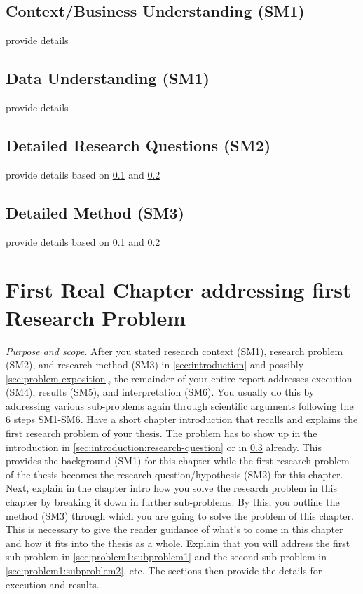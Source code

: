 \documentclass[peerreview,a4paper,english]{IEEEtran}[2015/08/26]
\begin{document}
\subsection{Context/Business Understanding (SM1)}\label{sec:problem-exposition:context-understanding}
provide details
\subsection{Data Understanding (SM1)}\label{sec:problem-exposition:data-understanding}
provide details
\subsection{Detailed Research Questions (SM2)}\label{sec:problem-exposition:research-problems}
provide details based on \cref{sec:problem-exposition:context-understanding} and \ref{sec:problem-exposition:data-understanding}
\subsection{Detailed Method (SM3)}\label{sec:problem-exposition:research-method}
provide details based on \cref{sec:problem-exposition:context-understanding} and \ref{sec:problem-exposition:data-understanding}
\section{First Real Chapter addressing first Research Problem}\label{sec:problem1}
\emph{Purpose and scope}. After you stated research context (SM1), research problem (SM2), and research method (SM3) in \cref{sec:introduction} and possibly \cref{sec:problem-exposition}, the remainder of your entire report addresses execution (SM4), results (SM5), and interpretation (SM6). You usually do this by addressing various sub-problems again through scientific arguments following the 6 steps SM1-SM6.
Have a short chapter introduction that recalls and explains the first research problem of your thesis. The problem has to show up in the introduction in \cref{sec:introduction:research-question} or in \cref{sec:problem-exposition:research-problems} already. This provides the background (SM1) for this chapter while the first research problem of the thesis becomes the research question/hypothesis (SM2) for this chapter.
Next, explain in the chapter intro how you solve the research problem in this chapter by breaking it down in further sub-problems. By this, you outline the method (SM3) through which you are going to solve the problem of this chapter. This is necessary to give the reader guidance of what's to come in this chapter and how it fits into the thesis as a whole. Explain that you will address the first sub-problem in \cref{sec:problem1:subproblem1} and the second sub-problem in \cref{sec:problem1:subproblem2}, etc. The sections then provide the details for execution and results.
\end{document}
